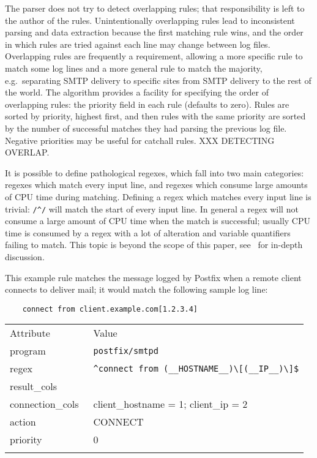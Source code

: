 \documentclass[draft]{svmult}
\newcommand{\daemon}[1]{%
    \texttt{postfix/#1}%
}
\begin{document}
The parser does not try to detect overlapping rules; that responsibility is
left to the author of the rules.  Unintentionally overlapping rules lead to
inconsistent parsing and data extraction because the first matching rule
wins, and the order in which rules are tried against each line may change
between log files.  Overlapping rules are frequently a requirement,
allowing a more specific rule to match some log lines and a more general
rule to match the majority, e.g.\ separating SMTP delivery to specific
sites from SMTP delivery to the rest of the world.  The algorithm provides
a facility for specifying the order of overlapping rules: the priority
field in each rule (defaults to zero).  Rules are sorted by priority,
highest first, and then rules with the same priority are sorted by the
number of successful matches they had parsing the previous log file.
Negative priorities may be useful for catchall rules.  XXX DETECTING
OVERLAP\@.

It is possible to define pathological regexes, which fall into two main
categories: regexes which match every input line, and regexes which consume
large amounts of CPU time during matching.  Defining a regex which matches
every input line is trivial: \verb!/^/! will match the start of every input
line.  In general a regex will not consume a large amount of CPU time when
the match is successful; usually CPU time is consumed by a regex with a lot
of alteration and variable quantifiers failing to match.  This topic is
beyond the scope of this paper, see~\cite{mastering-regular-expressions}
for in-depth discussion.

\label{example rule}

This example rule matches the message logged by Postfix when a remote
client connects to deliver mail; it would match the following sample log
line:

\begin{verbatim}
    connect from client.example.com[1.2.3.4]
\end{verbatim}

\begin{tabular}[]{ll}
    \hline
    \noalign{\smallskip}
    Attribute                 & Value                                            \\
    \noalign{\smallskip}
    \hline
    \noalign{\smallskip}
    program                   & \daemon{smtpd}                                   \\
    regex                     & \verb!^connect from (__HOSTNAME__)\[(__IP__)\]$! \\
    result\_cols              &                                                  \\
    connection\_cols~\empty{} & client\_hostname = 1; client\_ip = 2             \\
    action                    & CONNECT                                          \\
    priority                  & 0                                                \\
    \noalign{\smallskip}
    \hline
    \noalign{\smallskip}
\end{tabular}
\end{document}
